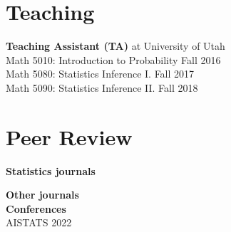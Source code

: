 \documentclass[margin,line]{res}
\newcommand{\ver}{\vspace*{-2.7mm}}
\begin{document}
\begin{resume}
\section{\sc Teaching}
\textbf{Teaching Assistant (TA)} at University of Utah\\
Math 5010: Introduction to Probability  \hfill Fall 2016\\ 
Math 5080: Statistics Inference I. \hfill Fall 2017\\
Math 5090: Statistics Inference II. \hfill Fall 2018

\section{\sc Peer Review}

\textbf{Statistics journals}\\

\ver

\textbf{Other journals}\\

\ver
\textbf{Conferences}\\
AISTATS 2022







\end{resume}
\end{document}
